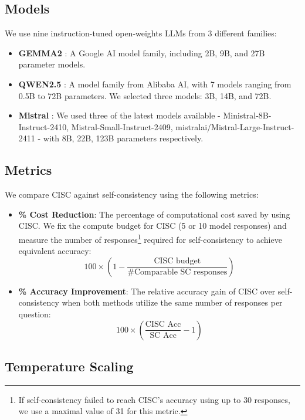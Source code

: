 \subsection{Models}
\label{sec:models}

We use nine instruction-tuned open-weights LLMs from 3 different families:

\begin{itemize}[itemsep=1pt, topsep=2pt,leftmargin=*]
\item \textbf{GEMMA2} \cite{team2024gemma}: A Google AI model family, including 2B, 9B, and 27B parameter models. 
\item \textbf{QWEN2.5} \cite{yang2024qwen2}: A model family from Alibaba AI, with 7 models ranging from 0.5B to 72B parameters. We selected three models: 3B, 14B, and 72B.
\item \textbf{Mistral} \cite{mistral}: We used three of the latest models available - Ministral-8B-Instruct-2410, Mistral-Small-Instruct-2409, mistralai/Mistral-Large-Instruct-2411 - with 8B, 22B, 123B parameters respectively.
\end{itemize}

\subsection{Metrics}
\label{sec:metrics}

We compare CISC against self-consistency using the following metrics:

\begin{itemize}[itemsep=1pt, topsep=2pt,leftmargin=*]

\item \textbf{\% Cost Reduction}: The percentage of computational cost saved by using CISC. We fix the compute budget for CISC (5 or 10 model responses) and measure the number of responses\footnote{If self-consistency failed to reach CISC's accuracy using up to 30 responses, we use a maximal value of 31 for this metric.} required for self-consistency to achieve equivalent accuracy:
$$100 \times \left(1 - \frac{\text{CISC budget}}{\text{\# Comparable SC responses}}\right)$$

\item \textbf{\% Accuracy Improvement}: The relative accuracy gain of CISC over self-consistency when both methods utilize the same number of responses per question: 
$$100 \times \left(\frac{\text{CISC Acc}}{\text{SC Acc}} - 1\right)$$
\end{itemize}

\subsection{Temperature Scaling}
\label{sec:temperature}

